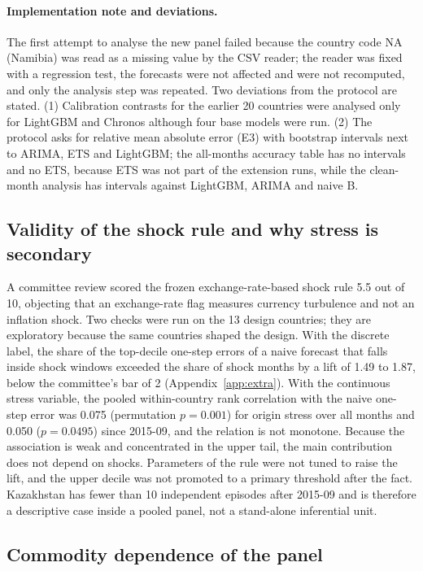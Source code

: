 \paragraph{Implementation note and deviations.} The first attempt to analyse the new panel failed because the country code NA (Namibia) was read as a missing value by the CSV reader; the reader was fixed with a regression test, the forecasts were not affected and were not recomputed, and only the analysis step was repeated. Two deviations from the protocol are stated. (1) Calibration contrasts for the earlier 20 countries were analysed only for LightGBM and Chronos although four base models were run. (2) The protocol asks for relative mean absolute error (E3) with bootstrap intervals next to ARIMA, ETS and LightGBM; the all-months accuracy table has no intervals and no ETS, because ETS was not part of the extension runs, while the clean-month analysis has intervals against LightGBM, ARIMA and naive B.

\subsection{Validity of the shock rule and why stress is secondary}\label{sec:shockvalid}

A committee review scored the frozen exchange-rate-based shock rule 5.5 out of 10, objecting that an exchange-rate flag measures currency turbulence and not an inflation shock. Two checks were run on the 13 design countries; they are exploratory because the same countries shaped the design. With the discrete label, the share of the top-decile one-step errors of a naive forecast that falls inside shock windows exceeded the share of shock months by a lift of 1.49 to 1.87, below the committee's bar of 2 (Appendix~\ref{app:extra}). With the continuous stress variable, the pooled within-country rank correlation with the naive one-step error was 0.075 (permutation $p=0.001$) for origin stress over all months and 0.050 ($p=0.0495$) since 2015-09, and the relation is not monotone. Because the association is weak and concentrated in the upper tail, the main contribution does not depend on shocks. Parameters of the rule were not tuned to raise the lift, and the upper decile was not promoted to a primary threshold after the fact. Kazakhstan has fewer than 10 independent episodes after 2015-09 and is therefore a descriptive case inside a pooled panel, not a stand-alone inferential unit.

\subsection{Commodity dependence of the panel}\label{sec:scope}


